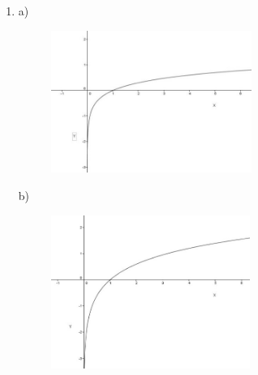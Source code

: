 \documentclass[12pt]{article}
\begin{document}
\vspace{\baselineskip}
\begin{enumerate}
	\item a) \par




\begin{figure}[H]
	\begin{Center}
		\includegraphics[width=2.58in,height=1.83in]{./media/image19.jpeg}
	\end{Center}
\end{figure}



\par

b)\par




\begin{figure}[H]
	\begin{Center}
		\includegraphics[width=2.55in,height=1.98in]{./media/image20.jpeg}
	\end{Center}
\end{figure}




\end{enumerate}
\end{document}
